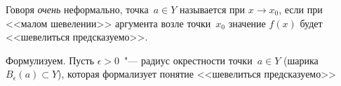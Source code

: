 Говоря \emph{очень} неформально, точка~$a \in Y$ называется  при $x \to x_0$, если при <<малом шевелении>>
аргумента возле точки~$x_0$ значение $f(x)$ будет <<шевелиться предсказуемо>>.

Формулизуем. Пусть $\epsilon > 0$~"--- радиус окрестности точки~$a \in Y$ (шарика~$B_{\epsilon}(a) \subset Y$), которая формализует понятие <<шевелиться предсказуемо>>

\begin{definition}
\end{definition}


